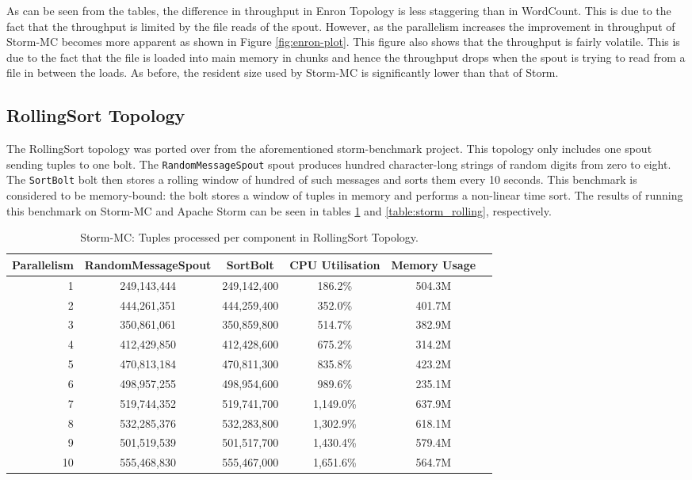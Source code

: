 \documentclass[bsc,logo,frontabs,twoside,singlespacing,normalheadings,parskip]{infthesis}\usepackage[]{graphicx}\usepackage[]{color}
\begin{document}
As can be seen from the tables, the difference in throughput in Enron Topology is less staggering than in WordCount. This is due to the fact that the throughput is limited by the file reads of the spout. However, as the parallelism increases the improvement in throughput of Storm-MC becomes more apparent as shown in Figure \ref{fig:enron-plot}. This figure also shows that the throughput is fairly volatile. This is due to the fact that the file is loaded into main memory in chunks and hence the throughput drops when the spout is trying to read from a file in between the loads. As before, the resident size used by Storm-MC is significantly lower than that of Storm.

\subsection{RollingSort Topology}

The RollingSort topology was ported over from the aforementioned storm-benchmark project. This topology only includes one spout sending tuples to one bolt. The \texttt{RandomMessageSpout} spout produces hundred character-long strings of random digits from zero to eight. The \texttt{SortBolt} bolt then stores a rolling window of hundred of such messages and sorts them every 10 seconds. This benchmark is considered to be memory-bound: the bolt stores a window of tuples in memory and performs a non-linear time sort. The results of running this benchmark on Storm-MC and Apache Storm can be seen in tables \ref{table:storm_mc_rolling} and \ref{table:storm_rolling}, respectively.

\begin{table}[!htb]
\begin{adjustwidth}{-0.5in}{-0.5in}
\centering
\small
\begin{tabular}{@{}rccccl@{}}
    {Parallelism} & {RandomMessageSpout} & {SortBolt} & {CPU Utilisation} & {Memory Usage} \\ \toprule
    1 & {249,143,444} & {249,142,400} & {186.2\%} & {504.3M} \\
    2 & {444,261,351} & {444,259,400} & {352.0\%} & {401.7M} \\
    3 & {350,861,061} & {350,859,800} & {514.7\%} & {382.9M} \\
    4 & {412,429,850} & {412,428,600} & {675.2\%} & {314.2M} \\
    5 & {470,813,184} & {470,811,300} & {835.8\%} & {423.2M} \\
    6 & {498,957,255} & {498,954,600} & {989.6\%} & {235.1M} \\
    7 & {519,744,352} & {519,741,700} & {1,149.0\%} & {637.9M} \\
    8 & {532,285,376} & {532,283,800} & {1,302.9\%} & {618.1M} \\
    9 & {501,519,539} & {501,517,700} & {1,430.4\%} & {579.4M} \\
    10 & {555,468,830} & {555,467,000} & {1,651.6\%} & {564.7M} \\ 
\end{tabular}
\caption{Storm-MC: Tuples processed per component in RollingSort Topology.}
\label{table:storm_mc_rolling}
\end{adjustwidth}
\end{table}
\end{document}

